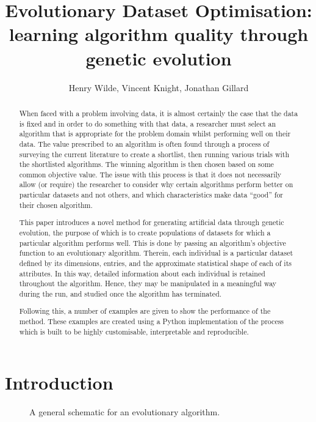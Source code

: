 \documentclass[10pt]{article}
\title{%
    Evolutionary Dataset Optimisation:
    learning algorithm quality through genetic evolution
}
\author{Henry Wilde, Vincent Knight, Jonathan Gillard}
\date{}
\newlength{\imgwidth}
\newcommand{\inputtikz}[3][\imgwidth]{%
    \begin{figure}[htbp]
        \centering
        \resizebox{#1}{!}{%
            
        }
        \caption{#3}
    \end{figure}
}
\begin{document}
\maketitle%
\bigskip%
\begin{abstract}
    When faced with a problem involving data, it is almost certainly the case
    that the data is fixed and in order to do something with that data, a
    researcher must select an algorithm that is appropriate for the problem
    domain whilst performing well on their data. The value prescribed to an
    algorithm is often found through a process of surveying the current
    literature to create a shortlist, then running various trials with the
    shortlisted algorithms. The winning algorithm is then chosen based on some
    common objective value. The issue with this process is that it does not
    necessarily allow (or require) the researcher to consider why certain
    algorithms perform better on particular datasets and not others, and which
    characteristics make data ``good'' for their chosen algorithm.

    This paper introduces a novel method for generating artificial data through
    genetic evolution, the purpose of which is to create populations of datasets
    for which a particular algorithm performs well. This is done by passing an
    algorithm's objective function to an evolutionary algorithm. Therein, each
    individual is a particular dataset defined by its dimensions, entries, and
    the approximate statistical shape of each of its attributes. In this way,
    detailed information about each individual is retained throughout the
    algorithm. Hence, they may be manipulated in a meaningful way during the
    run, and studied once the algorithm has terminated.

    Following this, a number of examples are given to show the performance of
    the method. These examples are created using a Python implementation of the
    process which is built to be highly customisable, interpretable and
    reproducible.
\end{abstract}

\newpage%
\section{Introduction}\label{section:introduction}

\inputtikz{flowchart.tex}{%
    A general schematic for an evolutionary algorithm.
}
\end{document}
